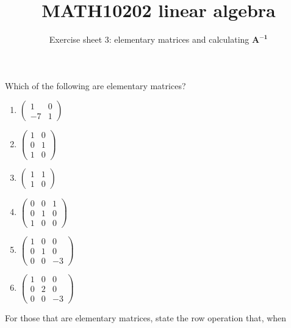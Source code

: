 \documentclass[english,12pt,a4paper]{scrartcl}
\title{MATH10202 linear algebra}
\subtitle{Exercise sheet 3: elementary matrices and calculating $\bm{A^{-1}}$}
\author{}
\date{\vspace{-5ex}}
\newenvironment{modenumerate}
  {\enumerate\setupmodenumerate}
  {\endenumerate}
\newif\ifmoditem
\newcommand{\setupmodenumerate}{%
  \global\moditemfalse
  \let\origmakelabel\makelabel
  \def\moditem##1{\global\moditemtrue\def\mesymbol{##1}\item}%
  \def\makelabel##1{%
  \origmakelabel{##1\ifmoditem\rlap{\mesymbol}\fi\enspace}%
\global\moditemfalse}%
}
\begin{document}
\maketitle

\begin{modenumerate}
  \moditem{*} Which of the following are elementary matrices?
    \begin{multicols}{3}[\setlength{\columnseprule}{0pt}]
      \begin{enumerate}
        \item $
          \begin{pmatrix}
            1 & 0 \\
            -7 & 1
          \end{pmatrix}
          $
        \item $
          \begin{pmatrix}
            1 & 0 \\
            0 & 1 \\
            1 & 0
          \end{pmatrix}
          $
        \item $
          \begin{pmatrix}
            1 & 1 \\
            1 & 0
          \end{pmatrix}
          $
        \item $
          \begin{pmatrix}
            0 & 0 & 1 \\
            0 & 1 & 0 \\
            1 & 0 & 0
          \end{pmatrix}
          $
        \item $
          \begin{pmatrix}
            1 & 0 & 0 \\
            0 & 1 & 0 \\
            0 & 0 & -3
          \end{pmatrix}
          $
        \item $
          \begin{pmatrix}
            1 & 0 & 0 \\
            0 & 2 & 0 \\
            0 & 0 & -3
          \end{pmatrix}
          $
      \end{enumerate}
    \end{multicols}
    For those that are elementary matrices, state the row operation that, when 

\end{modenumerate}
\end{document}
